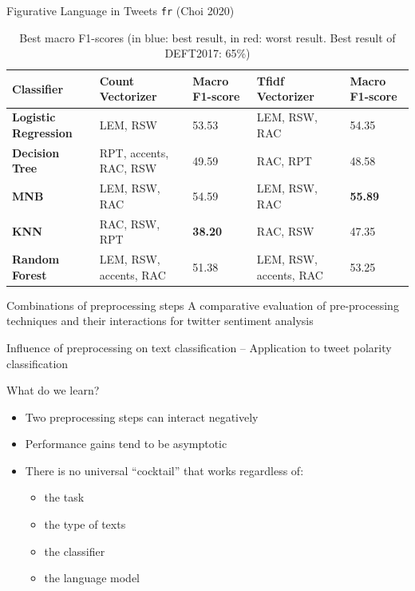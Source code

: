 \begin{frame}{Figurative Language in Tweets \texttt{fr} (Choi 2020)}
\begin{table}[!h]
\centering
\begin{small}
	\begin{tabular}{|p{1.8cm}|p{2.8cm}|p{1cm}|p{2.8cm}|p{1cm}|}
	\hline
    \textbf{Classifier}& \textbf{Count Vectorizer} & \textbf{Macro F1-score} & \textbf{Tfidf Vectorizer} & \textbf{Macro F1-score}\\
	\hline
	\textbf{Logistic Regression} & LEM, \mbox{RSW}	& 53.53  &	LEM, \mbox{RSW}, \mbox{RAC} & 54.35 \\
	\hline
	\textbf{Decision Tree}	& RPT, \mbox{accents}, \mbox{RAC}, \mbox{RSW}	& 49.59  & RAC, \mbox{RPT} & 48.58 \\
	\hline
	\textbf{MNB} & LEM, \mbox{RSW}, \mbox{RAC} & 54.59  & LEM, \mbox{RSW}, \mbox{RAC}	& {\color{blue}\textbf{55.89}}\\
	\hline
	\textbf{KNN} & RAC, \mbox{RSW}, \mbox{RPT}	& {\color{red}\textbf{38.20 }} & RAC, \mbox{RSW} & 47.35 \\
	\hline
	\textbf{Random Forest} & LEM, \mbox{RSW}, \mbox{accents}, \mbox{RAC} & 51.38  & LEM, \mbox{RSW}, \mbox{accents}, \mbox{RAC} & 53.25\\
	\hline
	\end{tabular}
\end{small}
\caption{Best macro F1-scores (in blue: best result, in red: worst result. Best result of DEFT2017: 65\%)}
\end{table}

\end{frame}

\begin{frame}{Combinations of preprocessing steps}
A comparative evaluation of pre-processing techniques and their interactions for twitter sentiment analysis \cite{Symeonidis-2018}
\pause

Influence of preprocessing on text classification – Application to tweet polarity classification \cite{Choi-2020}
\pause
\begin{block}{What do we learn?}
  \begin{itemize}
    \item Two preprocessing steps can interact negatively
    \item Performance gains tend to be asymptotic
\pause
    \item There is no universal “cocktail” that works regardless of:
     \begin{itemize}
        \item the task
        \item the type of texts
        \item the classifier
        \item the language model
    \end{itemize}
  \end{itemize}
\end{block}
\end{frame}

